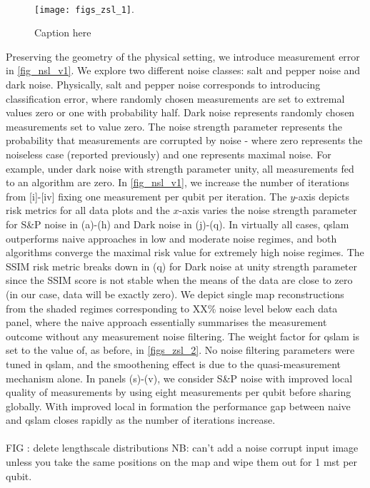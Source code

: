 \\
\begin{figure}
	\texttt{[image: figs\_zsl\_1]}. 
	\caption{\label{figs_zsl_1} Caption here}    	
\end{figure}
Preserving the geometry of the physical setting, we introduce measurement error in \cref{fig_nsl_v1}. We explore two different noise classes: salt and pepper noise and dark noise. Physically, salt and pepper noise corresponds to introducing classification error, where randomly chosen measurements are set to extremal values zero or one with probability half. Dark noise represents randomly chosen measurements set to value zero. The noise strength parameter represents the probability that measurements are corrupted by noise - where zero represents the noiseless case (reported previously)  and one represents maximal noise. For example, under dark noise with strength parameter unity, all measurements fed to an algorithm are zero. In \cref{fig_nsl_v1}, we increase the number of iterations from [i]-[iv] fixing one measurement per qubit per iteration. The $y$-axis depicts risk metrics for all data plots and the $x$-axis varies the noise strength parameter for S\&P noise in (a)-(h) and Dark noise in (j)-(q). In virtually all cases, qslam outperforms naive approaches in low and moderate noise regimes, and both algorithms converge the maximal risk value for extremely high noise regimes. The SSIM risk metric breaks down in (q) for Dark noise at unity strength parameter since the SSIM score is not stable when the means of the data are close to zero (in our case, data will be exactly zero). We depict single map reconstructions from the shaded regimes corresponding to XX\% noise level below each data panel, where the naive approach essentially summarises the measurement outcome without any measurement noise filtering. The weight factor for qslam is set to the value of, as before, in \cref{figs_zsl_2}. No noise filtering parameters were tuned in qslam, and the smoothening effect is due to the quasi-measurement mechanism alone. In panels (s)-(v), we consider S\&P noise with improved local quality of measurements by using eight measurements per qubit before sharing globally. With improved local in formation the performance gap between naive and qslam closes rapidly as the number of iterations increase.\\
\\
FIG : delete lengthscale distributions 
NB: can't add a noise corrupt input image unless you take the same positions on the map and wipe them out for 1 mst per qubit.\\
